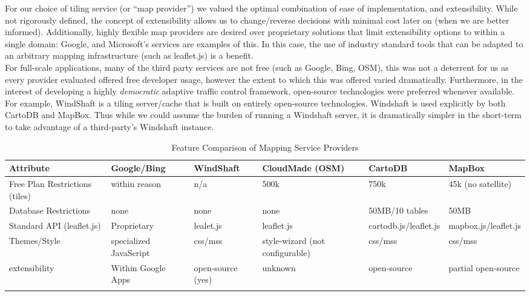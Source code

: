 \documentclass{article}
\begin{document}
For our choice of tiling service (or ``map provider'') we valued the optimal combination of ease of implementation, and extensibility.
While not rigorously defined, the concept of extensibility allows us to change/reverse decisions with minimal cost later on (when we are better informed).
Additionally, highly flexible map providers are desired over proprietary solutions that limit extensibility options to within a single domain: Google, and Microsoft's services are examples of this.
In this case, the use of industry standard tools that can be adapted to an arbitrary mapping infrastructure (such as leaflet.js) is a benefit.\\

For full-scale applications, many of the third party services are not free (such as Google, Bing, OSM), this was not a deterrent for us as every provider evaluated offered free developer usage, however the extent to which this was offered varied dramatically.
Furthermore, in the interest of developing a highly \emph{democratic} adaptive traffic control framework, open-source technologies were preferred whenever available.
For example, WindShaft is a tiling server/cache that is built on entirely open-source technologies.
Windshaft is used explicitly by both CartoDB and MapBox.
Thus while we could assume the burden of running a Windshaft server, it is dramatically simpler in the short-term to take advantage of a third-party's Windshaft instance.\\

\begin{longtable}{|p{2.6cm}|p{2.1cm}|p{2cm}|p{2cm}|p{2.8cm}|p{2.8cm}|} \hline
    \textbf{Attribute}                        & \textbf{Google/Bing}            & \textbf{WindShaft}         & \textbf{CloudMade (OSM)}                 & \textbf{CartoDB}               & \textbf{MapBox}               \\ \hline
    Free Plan Restrictions (tiles) & within reason          & n/a               & 500k                            & 750k                  & 45k (no satellite)   \\ \hline
    Database Restrictions            & none                   & none              & none                            & 50MB/10 tables        & 50MB                 \\ \hline
    Standard API (leaflet.js)        & Proprietary            & lealet.js         & leaflet.js                      & cartodb.js/leaflet.js & mapbox.js/leaflet.js \\ \hline
    Themes/Style                     & specialized JavaScript & css/mss           & style-wizard (not configurable) & css/mss               & css/mss              \\ \hline
    extensibility                    & Within Google Apps     & open-source (yes) & unknown                         & open-source           & partial open-source  \\ \hline
    \caption{Feature Comparison of Mapping Service Providers}
    \label{tab:Map_Provider_Attributes}
\end{longtable}
\end{document}
